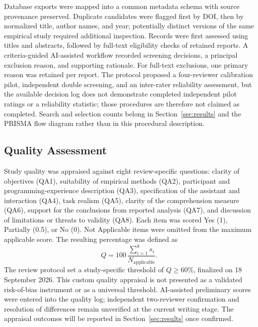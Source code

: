 \documentclass[conference]{IEEEtran}
\begin{document}
Database exports were mapped into a common metadata schema with source provenance preserved. Duplicate candidates were flagged first by DOI, then by normalized title, author names, and year; potentially distinct versions of the same empirical study required additional inspection. Records were first assessed using titles and abstracts, followed by full-text eligibility checks of retained reports. A criteria-guided AI-assisted workflow recorded screening decisions, a principal exclusion reason, and supporting rationale. For full-text exclusions, one primary reason was retained per report. The protocol proposed a four-reviewer calibration pilot, independent double screening, and an inter-rater reliability assessment, but the available decision log does not demonstrate completed independent pilot ratings or a reliability statistic; those procedures are therefore not claimed as completed. Search and selection counts belong in Section~\ref{sec:results} and the PRISMA flow diagram rather than in this procedural description.

\subsection{Quality Assessment}
Study quality was appraised against eight review-specific questions: clarity of objectives (QA1), suitability of empirical methods (QA2), participant and programming-experience description (QA3), specification of the assistant and interaction (QA4), task realism (QA5), clarity of the comprehension measure (QA6), support for the conclusions from reported analysis (QA7), and discussion of limitations or threats to validity (QA8). Each item was scored Yes (1), Partially (0.5), or No (0). Not Applicable items were omitted from the maximum applicable score. The resulting percentage was defined as
\begin{equation}
Q=100\,\frac{\sum_{i=1}^{8}s_i}{N_{\mathrm{applicable}}}.
\label{eq:qa_score}
\end{equation}
The review protocol set a study-specific threshold of $Q\geq60\%$, finalized on 18 September 2026. This custom quality appraisal is not presented as a validated risk-of-bias instrument or as a universal threshold. AI-assisted preliminary scores were entered into the quality log; independent two-reviewer confirmation and resolution of differences remain unverified at the current writing stage. The appraisal outcomes will be reported in Section~\ref{sec:results} once confirmed.
\end{document}
